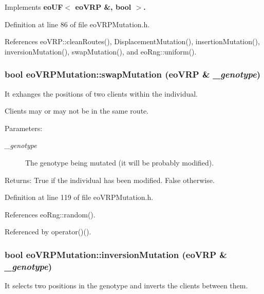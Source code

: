 Implements \bf{eo\-UF$<$ eo\-VRP \&, bool $>$}.

Definition at line 86 of file eo\-VRPMutation.h.

References eo\-VRP::clean\-Routes(), Displacement\-Mutation(), insertion\-Mutation(), inversion\-Mutation(), swap\-Mutation(), and eo\-Rng::uniform().
\subsubsection{\setlength{\rightskip}{0pt plus 5cm}bool eo\-VRPMutation::swap\-Mutation (\bf{eo\-VRP} \& {\em \_\-genotype})\hspace{0.3cm}{\tt  [inline, private]}}\label{classeo_v_r_p_mutation_bef9736583de0b7f6e734b26483ab69d}


It exhanges the positions of two clients within the individual. 

Clients may or may not be in the same route. \begin{Desc}
\item[Parameters:]
\begin{description}
\item[{\em \_\-genotype}]The genotype being mutated (it will be probably modified). \end{description}
\end{Desc}
\begin{Desc}
\item[Returns:]True if the individual has been modified. False otherwise. \end{Desc}


Definition at line 119 of file eo\-VRPMutation.h.

References eo\-Rng::random().

Referenced by operator()().
\subsubsection{\setlength{\rightskip}{0pt plus 5cm}bool eo\-VRPMutation::inversion\-Mutation (\bf{eo\-VRP} \& {\em \_\-genotype})\hspace{0.3cm}{\tt  [inline, private]}}\label{classeo_v_r_p_mutation_61cc39a190e9d070b005a7afb5e38d2a}


It selects two positions in the genotype and inverts the clients between them. 

